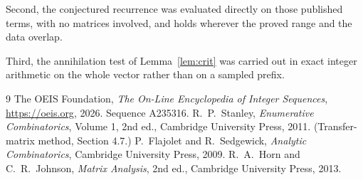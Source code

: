 \documentclass[11pt,a4paper]{article}
\theoremstyle{plain}
\theoremstyle{definition}
\begin{document}
Second, the conjectured recurrence was evaluated directly on those published terms, with no
matrices involved, and holds wherever the proved range and the data overlap.

Third, the annihilation test of Lemma~\ref{lem:crit} was carried out in exact integer
arithmetic on the whole vector rather than on a sampled prefix.

\begin{thebibliography}{9}
 The OEIS Foundation, \emph{The On-Line Encyclopedia of Integer
Sequences}, \url{https://oeis.org}, 2026. Sequence A235316.
 R.~P.~Stanley, \emph{Enumerative Combinatorics}, Volume 1, 2nd ed.,
Cambridge University Press, 2011. (Transfer-matrix method, Section 4.7.)
 P.~Flajolet and R.~Sedgewick, \emph{Analytic Combinatorics}, Cambridge
University Press, 2009.
 R.~A.~Horn and C.~R.~Johnson, \emph{Matrix Analysis}, 2nd ed., Cambridge
University Press, 2013.
\end{thebibliography}
\end{document}
